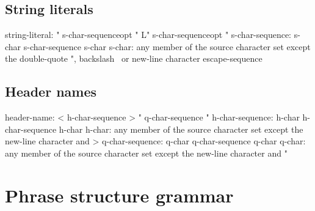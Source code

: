 \subsection{String literals}
\begin{code_files}
string-literal:
	" s-char-sequenceopt "
	L" s-char-sequenceopt "
s-char-sequence:
	s-char
	s-char-sequence s-char
s-char:
	any member of the source character set except
	the double-quote ", backslash \, or new-line character
	escape-sequence
\end{code_files}

\subsection{Header names}
\begin{code_files}
header-name:
	< h-char-sequence >
	" q-char-sequence "
h-char-sequence:
	h-char
	h-char-sequence h-char
h-char:
	any member of the source character set except
	the new-line character and >
q-char-sequence:
	q-char
	q-char-sequence q-char
q-char:
	any member of the source character set except
	the new-line character and "
\end{code_files}

\section{Phrase structure grammar}

